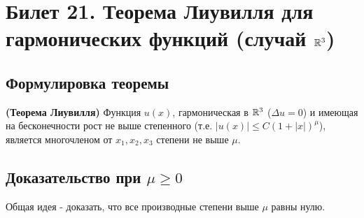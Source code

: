 \section{Билет 21. Теорема Лиувилля для гармонических функций (случай $\mathbb{R}^3$)}

\subsection{Формулировка теоремы} 

\begin{theorem}

{\bf (Теорема Лиувилля)} Функция $u(x)$, гармоническая в $\mathbb{R}^3$ ($\Delta u = 0$)  и имеющая на бесконечности рост не выше степенного (т.е. $|u(x)| \le C (1+|x|)^{\mu}$), является многочленом от $x_1,x_2,x_3$ степени не выше $\mu$.

\end{theorem}

\subsection{Доказательство при $\mu \ge 0$}

Общая идея - доказать, что все производные степени выше $\mu$ равны нулю.


